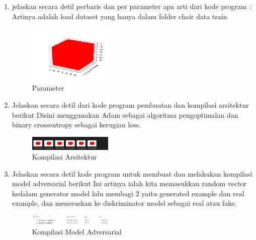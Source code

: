 \begin{enumerate}
        	\item jelaskan secara detil perbaris dan per parameter apa arti dari kode program :
Artinya adalah load dataset yang hanya dalam folder chair data train

		

		\begin{figure}[H]
			\includegraphics[width=4cm]{figures/1174008/8/praktik12.PNG}
            		\centering
           		\caption{Parameter}
       	 	\end{figure}

        	\item Jelaskan secara detil dari kode program pembuatan dan kompilasi arsitektur berikut 
Disini menggunakan Adam sebagai algoritma pengoptimalan dan binary crossentropy sebagai kerugian loss. 

		

		\begin{figure}[H]
			\includegraphics[width=4cm]{figures/1174008/8/praktik13.PNG}
            		\centering
           		\caption{Kompilasi Arsitektur}
       	 	\end{figure}

        	\item Jelaskan secara detil kode program untuk membuat dan melakukan kompilasi model adversarial berikut
Ini artinya ialah kita memasukkan random vector kedalam generator model lalu membagi 2 yaitu generated example dan real example, dan meneruskan ke diskriminator model sebagai real atau fake.

		

		\begin{figure}[H]
			\includegraphics[width=4cm]{figures/1174008/8/praktik14.PNG}
            		\centering
           		\caption{Kompilasi Model Adversarial}
       	 	\end{figure}


\end{enumerate}
